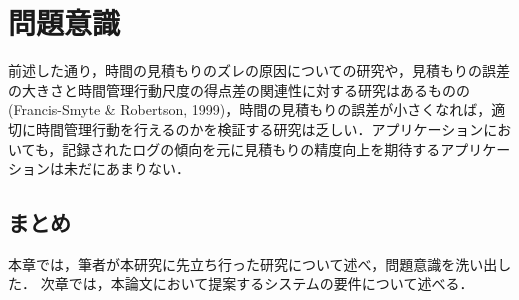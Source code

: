 \chapter{問題意識}

前述した通り，時間の見積もりのズレの原因についての研究や，見積もりの誤差の大きさと時間管理行動尺度の得点差の関連性に対する研究はあるものの(Francis-Smyte \& Robertson, 1999)，時間の見積もりの誤差が小さくなれば，適切に時間管理行動を行えるのかを検証する研究は乏しい．アプリケーションにおいても，記録されたログの傾向を元に見積もりの精度向上を期待するアプリケーションは未だにあまりない．

\section{まとめ}
本章では，筆者が本研究に先立ち行った研究について述べ，問題意識を洗い出した．
次章では，本論文において提案するシステムの要件について述べる．